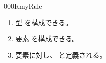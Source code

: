 \documentclass[index]{subfiles}
\begin{document}
\begin{myBlock}{000K}{myRule}
  \begin{enumerate}
  \item 型\myInlineMath{\myUnitType \myElemOf \myUniverse{\myLevelZero}}
    を構成できる。
  \item 要素\myInlineMath{\myUnitElem \myElemOf \myUnitType}
    を構成できる。
  \item 要素に対し、
    と定義される。
  \end{enumerate}
\end{myBlock}
\end{document}
